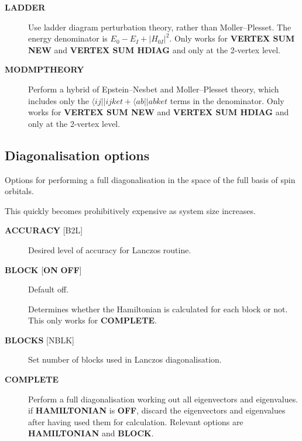 \documentclass[openany,a4paper,10pt]{manual}
\newcommand{\bra}{\ensuremath{\langle}}
\begin{document}
\begin{description}
\item[\textbf{LADDER}]
Use ladder diagram perturbation theory, rather than Moller--Plesset.
The energy denominator is $E_0-E_I+|H_{0I}|^2$.  Only works
for \textbf{VERTEX SUM NEW} and \textbf{VERTEX SUM HDIAG} and only at the
2-vertex level.

\item[\textbf{MODMPTHEORY}]
Perform a hybrid of Epstein--Nesbet and Moller--Plesset theory,
which includes only the $\bra ij||ij ket +\bra ab||ab ket$
terms in the denominator.  Only works for \textbf{VERTEX SUM NEW} and
\textbf{VERTEX SUM HDIAG} and only at the 2-vertex level.

\end{description}


\subsection{Diagonalisation options}

Options for performing a full diagonalisation in the space of the full
basis of spin orbitals.

\begin{notice}[warning]
This quickly becomes prohibitively expensive as system size increases.
\end{notice}
\begin{description}
\item[\textbf{ACCURACY} {[}B2L{]}]
Desired level of accuracy for Lanczos routine.

\item[\textbf{BLOCK} {[}\textbf{ON} \textbf{OFF}{]}]
Default off.

Determines whether the Hamiltonian is calculated for each block
or not.  This only works for \textbf{COMPLETE}.

\item[\textbf{BLOCKS} {[}NBLK{]}]
Set number of blocks used in Lanczos diagonalisation.

\item[\textbf{COMPLETE}]
Perform a full diagonalisation working out all eigenvectors
and eigenvalues.  if \textbf{HAMILTONIAN} is \textbf{OFF}, discard the
eigenvectors and eigenvalues after having used them for calculation.
Relevant options are \textbf{HAMILTONIAN} and \textbf{BLOCK}.

\end{description}
\end{document}
